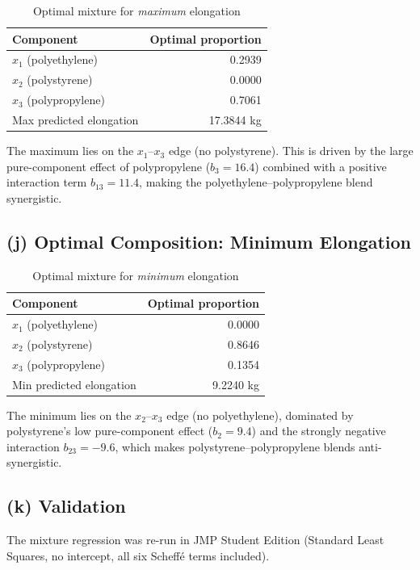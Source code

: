 \documentclass[12pt,a4paper]{article}
\begin{document}
\begin{table}[H]
\centering
\caption{Optimal mixture for \emph{maximum} elongation}
\begin{tabular}{lr}
\toprule
Component & Optimal proportion \\
\midrule
$x_1$ (polyethylene)   & 0.2939 \\
$x_2$ (polystyrene)    & 0.0000 \\
$x_3$ (polypropylene)  & 0.7061 \\
\midrule
Max predicted elongation & 17.3844 kg \\
\bottomrule
\end{tabular}
\end{table}

The maximum lies on the $x_1$--$x_3$ edge (no polystyrene). This is driven by
the large pure-component effect of polypropylene ($b_3 = 16.4$) combined with
a positive interaction term $b_{13} = 11.4$, making the polyethylene--polypropylene
blend synergistic.

\subsection{(j) Optimal Composition: Minimum Elongation}

\begin{table}[H]
\centering
\caption{Optimal mixture for \emph{minimum} elongation}
\begin{tabular}{lr}
\toprule
Component & Optimal proportion \\
\midrule
$x_1$ (polyethylene)   & 0.0000 \\
$x_2$ (polystyrene)    & 0.8646 \\
$x_3$ (polypropylene)  & 0.1354 \\
\midrule
Min predicted elongation & 9.2240 kg \\
\bottomrule
\end{tabular}
\end{table}

The minimum lies on the $x_2$--$x_3$ edge (no polyethylene), dominated by
polystyrene's low pure-component effect ($b_2 = 9.4$) and the strongly negative
interaction $b_{23} = -9.6$, which makes polystyrene--polypropylene blends
anti-synergistic.

\subsection{(k) Validation}

The mixture regression was re-run in JMP Student Edition (Standard Least Squares,
no intercept, all six Scheff\'{e} terms included).
\end{document}
